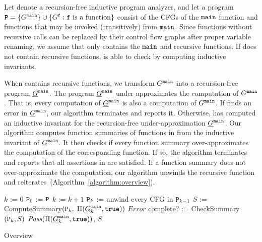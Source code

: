 Let  denote a recursion-free inductive program analyzer,
and let a program $\textup{\texttt{{P}}}=\{G^{\mathtt{{main}}}\}\cup\{G^{\mathtt{{f}}} : \mathtt{{f}}\mbox{ is a function}\}$
consist of the CFGs of the $\mathtt{{main}}$ function and functions that may be
invoked (transitively) from $\mathtt{{main}}$.
Since functions without recursive calls can be replaced by their control flow
graphs after proper variable renaming,
we assume that  only contains the $\mathtt{{main}}$ and recursive functions.
If  does not contain recursive functions,
 is able to check  by computing inductive invariants.


When  contains recursive functions, we transform $G^{\mathtt{{main}}}$ into a
recursion-free program $\underline{G}^{\mathtt{{main}}}$. The program $\underline{G}^{\mathtt{{main}}}$
under-approximates the computation of $G^{\mathtt{{main}}}$. That is, every computation
of $\underline{G}^{\mathtt{{main}}}$ is also a computation of $G^{\mathtt{{main}}}$. If
 finds an error in $\underline{G}^{\mathtt{{main}}}$, our
algorithm terminates and reports it. Otherwise,
 has computed an inductive invariant for the
recursion-free under-approximation $\underline{G}^{\mathtt{{main}}}$. Our algorithm
computes function summaries of functions in  from the inductive invariant of
$\underline{G}^{\mathtt{{main}}}$. It then checks if every function summary
over-approximates the computation of the corresponding function. If
so, the algorithm terminates and reports that all assertions in 
are satisfied. If a function summary does not over-approximate the
computation, our algorithm unwinds the recursive function and
reiterates~(Algorithm~\ref{algorithm:overview}).

\begin{algorithm}[htb]
\begin{doublespace}

  $k$ := $0$\;
  $\textup{\texttt{{P}}}_0$ := $\textup{\texttt{{P}}}$\;
  {
    $k$ := $k + 1$\;
    $\textup{\texttt{{P}}}_{k}$ := unwind every CFG in $\textup{\texttt{{P}}}_{k-1}$\;
    {
      {    
        $S$ := ComputeSummary$(\textup{\texttt{{P}}}_k,$ $\Pi (\underline{G}^{\mathtt{{main}}}_k, \mathtt{true}))$
      }
      {
        \Return $\mathit{Error}$
      }
    }
    complete? := CheckSummary$(\textup{\texttt{{P}}}_k, S)$\;
  }
  \Return $\mathit{Pass} (\Pi (\underline{G}^{\mathtt{{main}}}_k, \mathtt{true}))$, $S$\;
\end{doublespace}
  \caption{Overview}
  \label{algorithm:overview}
\end{algorithm} 

